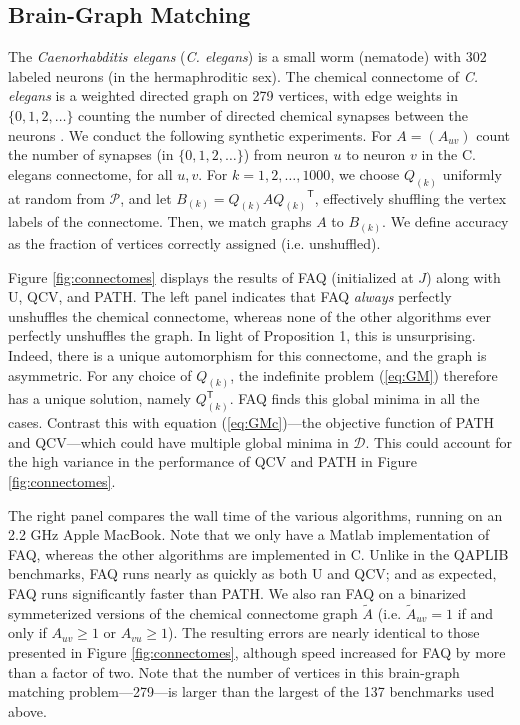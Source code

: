 \documentclass[10pt]{article}
\providecommand{\mc}[1]{\mathcal{#1}}
\providecommand{\mc}[1]{\mathcal{#1}}
\newcommand{\T}{^{\ensuremath{\mathsf{T}}}}
\begin{document}
\subsection{Brain-Graph Matching} 
\label{sub:connectome}




The \emph{Caenorhabditis elegans} (\emph{C. elegans}) is a small worm (nematode) with $302$ labeled neurons (in the hermaphroditic sex).  The chemical connectome of \emph{C. elegans} is a weighted directed graph on 279 vertices, with edge weights in $\{0,1,2,\ldots\}$ counting the number of directed chemical synapses between the neurons \cite{WhiteBrenner86, Varshney2011}.    
We conduct the following synthetic experiments.  
For $A=(A_{uv})$ count the number of synapses (in $\{0,1,2,\ldots\}$) from neuron $u$ to neuron $v$ in the C. elegans connectome, for all $u,v$.  For $k =1,2,\ldots, 1000$, we choose $Q_{(k)}$ uniformly at random from $\mc{P}$, and let $B_{(k)}=Q_{(k)} A {Q_{(k)}}\T$, effectively shuffling the vertex labels of the connectome.  Then, we match graphs $A$ to $B_{(k)}$.  We define accuracy as the fraction of vertices correctly assigned (i.e. unshuffled).



Figure \ref{fig:connectomes} displays the results of FAQ (initialized at $J$) along with U, QCV,  and PATH.  The left panel indicates that FAQ \emph{always} perfectly unshuffles the chemical connectome, whereas none of the other algorithms ever perfectly unshuffles the graph.  
In light of Proposition 1, this is unsurprising.  Indeed, there is a unique automorphism for this connectome, and the graph is asymmetric.  For any choice of $Q_{(k)}$, the indefinite problem (\ref{eq:GM}) therefore has a unique solution, namely $Q_{(k)}\T$.  FAQ finds this global minima in all the cases.  Contrast this with equation (\ref{eq:GMc})---the objective function of PATH and QCV---which could have multiple global minima in $\mc{D}$.  This could account for the high variance in the performance of QCV and PATH in Figure \ref{fig:connectomes}. 
 
The right panel compares the wall time of the various algorithms, running on an 2.2 GHz Apple MacBook. Note that we only have a Matlab implementation of FAQ, whereas the other algorithms are implemented in C.  
Unlike in the QAPLIB benchmarks, FAQ runs nearly as quickly as both U and QCV; and as expected, FAQ runs significantly faster than PATH.  
We also ran FAQ on a binarized symmeterized versions of the chemical connectome graph $\tilde A$ (i.e. $\tilde A_{uv}=1$ if and only if $A_{uv}\geq 1$ or $A_{vu} \geq 1$).  The resulting errors are nearly identical to those presented in Figure \ref{fig:connectomes}, although speed increased for FAQ by more than a factor of two. Note that the number of vertices in this brain-graph matching problem---279---is larger than the largest of the 137 benchmarks used above. 
\end{document}
